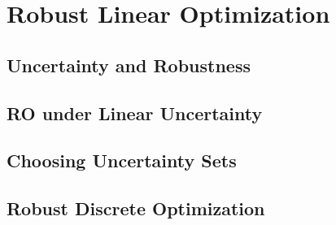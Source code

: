 \documentclass{bookest}
\begin{document}
%		
%	
%	
%	
%	
%	
	

	\part{Robust Linear Optimization}
	
	\chapter{Uncertainty and Robustness} \label{chapter_1}
	
	
	\chapter{RO under Linear Uncertainty} \label{chapter_2}\label{chapter3-2}
	
	
	\chapter{Choosing Uncertainty Sets} \label{chapter_3}
	
	
	\chapter{Robust Discrete Optimization} \label{chapter_3}
	
	
\end{document}
